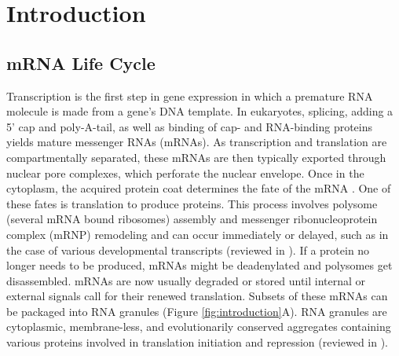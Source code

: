 \chapter{Introduction}


\section{mRNA Life Cycle}

Transcription is the first step in gene expression in which a premature RNA molecule is made from a gene's DNA template.
In eukaryotes, splicing, adding a 5' cap and poly-A-tail, as well as binding of cap- and RNA-binding proteins yields mature messenger RNAs (mRNAs).
As transcription and translation are compartmentally separated, these mRNAs are then typically exported through nuclear pore complexes, which perforate the nuclear envelope.
Once in the cytoplasm, the acquired protein coat determines the fate of the mRNA \cite{moore_birth_2005}.
One of these fates is translation to produce proteins.
This process involves polysome (several mRNA bound ribosomes) assembly and messenger ribonucleoprotein complex (mRNP) remodeling and can occur immediately or delayed, such as in the case of various developmental transcripts (reviewed in \cite{swinburne_intron_2008}).
If a protein no longer needs to be produced, mRNAs might be deadenylated and polysomes get disassembled.
mRNAs are now usually degraded or stored until internal or external signals call for their renewed translation.
Subsets of these mRNAs can be packaged into RNA granules (Figure \ref{fig:introduction}A).
RNA granules are cytoplasmic, membrane-less, and evolutionarily conserved aggregates containing various proteins involved in translation initiation and repression (reviewed in \cite{anderson_rna_2006}).

